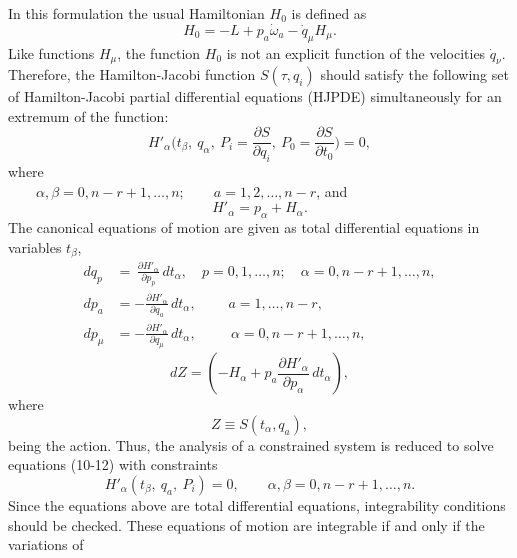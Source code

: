 \documentclass[12pt]{article}
\begin{document}
In this formulation the usual Hamiltonian $H_{0}$ is defined as
\begin{equation}\label{7}
H_{0}=-L+ p_{a}{{\dot{\omega}}_a}-{{\dot{q}}_{\mu}}H_{\mu}.
\end{equation}
Like functions $H_{\mu}$, the function $H_{0}$ is not an explicit
function of the velocities ${\dot{q}}_{\nu}$. Therefore, the
Hamilton-Jacobi function $S(\tau,q_{i})$ should satisfy the
following set of Hamilton-Jacobi partial differential equations
(HJPDE) simultaneously for an extremum of the function:
\begin{equation}\label{8}
H'_{\alpha}\bigg(t_{\beta},~q_{\alpha},~P_{i}=\frac{\partial
S}{\partial q_{i}} ,~P_{0}=\frac{\partial S}{\partial
t_{0}}\bigg)=0,
\end{equation}
where\\
$\qquad {\alpha,\beta =0,n-r+1,\ldots,n};\qquad {a =
1,2,\ldots,n-r}$, and
\begin{equation}\label{9}
H'_{\alpha}=p_{\alpha}+H_{\alpha}.
\end{equation}
The canonical equations of motion are given as total differential
equations in variables $t_{\beta}$,
\begin{align}
dq_{p}&=\,\frac{\partial H'_{\alpha}}{\partial p_{p}}\,
dt_{\alpha},\quad {p= 0,1,\ldots,n};\quad {\alpha= 0,n-r+1,\ldots,n},\label{10}\\
dp_{a}&=-\frac{\partial H'_{\alpha}}{\partial q_{a}}\,
dt_{\alpha},\;\qquad a=1,\ldots,n-r,\label{11}\\
dp_{\mu}&=-\frac{\partial H'_{\alpha}}{\partial
q_{\mu}}\,dt_{\alpha}, \,\;\quad \quad \alpha =
0,n-r+1,\ldots,n,\label{12}
\end{align}
\begin{equation}\label{13}
dZ= \left(-H_{\alpha}+p_{a}\frac{\partial H'_{\alpha}}{\partial
p_{\alpha}}\,dt_{\alpha}\right),
\end{equation}
where
\begin{equation}\label{14}
Z\equiv S(t_{\alpha},q_{a}),
\end{equation}
being the action. Thus, the analysis of a constrained system is
reduced to solve equations (10-12) with constraints
\begin{equation}\label{15}
H'_{\alpha}(t_{\beta},~q_{a},~P_{i})=0,\qquad {\alpha,\beta
=0,n-r+1,\ldots,n}.
\end{equation}
Since the equations above are total differential equations,
integrability conditions should be checked. These equations of
motion are integrable if and only if the variations of
\end{document}
